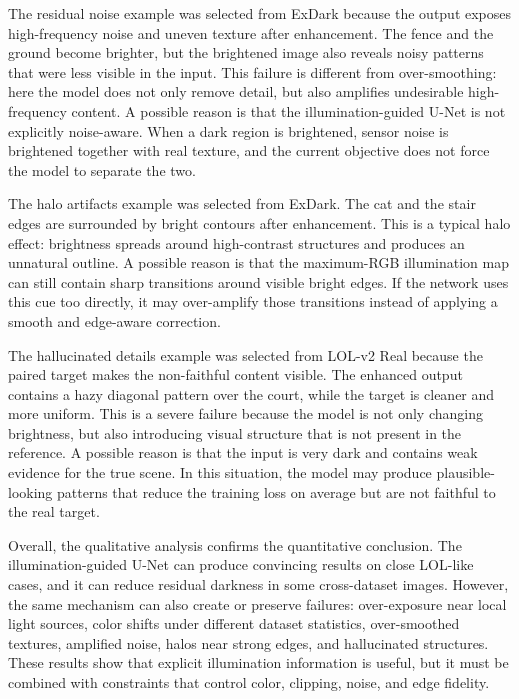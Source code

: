 The residual noise example was selected from ExDark because the output exposes high-frequency noise and uneven texture after enhancement. The fence and the ground become brighter, but the brightened image also reveals noisy patterns that were less visible in the input. This failure is different from over-smoothing: here the model does not only remove detail, but also amplifies undesirable high-frequency content. A possible reason is that the illumination-guided U-Net is not explicitly noise-aware. When a dark region is brightened, sensor noise is brightened together with real texture, and the current objective does not force the model to separate the two.

The halo artifacts example was selected from ExDark. The cat and the stair edges are surrounded by bright contours after enhancement. This is a typical halo effect: brightness spreads around high-contrast structures and produces an unnatural outline. A possible reason is that the maximum-RGB illumination map can still contain sharp transitions around visible bright edges. If the network uses this cue too directly, it may over-amplify those transitions instead of applying a smooth and edge-aware correction.

The hallucinated details example was selected from LOL-v2 Real because the paired target makes the non-faithful content visible. The enhanced output contains a hazy diagonal pattern over the court, while the target is cleaner and more uniform. This is a severe failure because the model is not only changing brightness, but also introducing visual structure that is not present in the reference. A possible reason is that the input is very dark and contains weak evidence for the true scene. In this situation, the model may produce plausible-looking patterns that reduce the training loss on average but are not faithful to the real target.

Overall, the qualitative analysis confirms the quantitative conclusion. The illumination-guided U-Net can produce convincing results on close LOL-like cases, and it can reduce residual darkness in some cross-dataset images. However, the same mechanism can also create or preserve failures: over-exposure near local light sources, color shifts under different dataset statistics, over-smoothed textures, amplified noise, halos near strong edges, and hallucinated structures. These results show that explicit illumination information is useful, but it must be combined with constraints that control color, clipping, noise, and edge fidelity.

